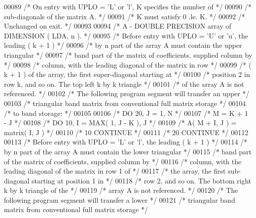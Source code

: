 \begin{DoxyCode}
00089 \textcolor{comment}{/*           On entry with UPLO = 'L' or 'l', K specifies the number of */}
00090 \textcolor{comment}{/*           sub-diagonals of the matrix A. */}
00091 \textcolor{comment}{/*           K must satisfy  0 .le. K. */}
00092 \textcolor{comment}{/*           Unchanged on exit. */}
00093 
00094 \textcolor{comment}{/*  A      - DOUBLE PRECISION array of DIMENSION ( LDA, n ). */}
00095 \textcolor{comment}{/*           Before entry with UPLO = 'U' or 'u', the leading ( k + 1 ) */}
00096 \textcolor{comment}{/*           by n part of the array A must contain the upper triangular */}
00097 \textcolor{comment}{/*           band part of the matrix of coefficients, supplied column by */}
00098 \textcolor{comment}{/*           column, with the leading diagonal of the matrix in row */}
00099 \textcolor{comment}{/*           ( k + 1 ) of the array, the first super-diagonal starting at */}
00100 \textcolor{comment}{/*           position 2 in row k, and so on. The top left k by k triangle */}
00101 \textcolor{comment}{/*           of the array A is not referenced. */}
00102 \textcolor{comment}{/*           The following program segment will transfer an upper */}
00103 \textcolor{comment}{/*           triangular band matrix from conventional full matrix storage */}
00104 \textcolor{comment}{/*           to band storage: */}
00105 
00106 \textcolor{comment}{/*                 DO 20, J = 1, N */}
00107 \textcolor{comment}{/*                    M = K + 1 - J */}
00108 \textcolor{comment}{/*                    DO 10, I = MAX( 1, J - K ), J */}
00109 \textcolor{comment}{/*                       A( M + I, J ) = matrix( I, J ) */}
00110 \textcolor{comment}{/*              10    CONTINUE */}
00111 \textcolor{comment}{/*              20 CONTINUE */}
00112 
00113 \textcolor{comment}{/*           Before entry with UPLO = 'L' or 'l', the leading ( k + 1 ) */}
00114 \textcolor{comment}{/*           by n part of the array A must contain the lower triangular */}
00115 \textcolor{comment}{/*           band part of the matrix of coefficients, supplied column by */}
00116 \textcolor{comment}{/*           column, with the leading diagonal of the matrix in row 1 of */}
00117 \textcolor{comment}{/*           the array, the first sub-diagonal starting at position 1 in */}
00118 \textcolor{comment}{/*           row 2, and so on. The bottom right k by k triangle of the */}
00119 \textcolor{comment}{/*           array A is not referenced. */}
00120 \textcolor{comment}{/*           The following program segment will transfer a lower */}
00121 \textcolor{comment}{/*           triangular band matrix from conventional full matrix storage */}

\end{DoxyCode}
